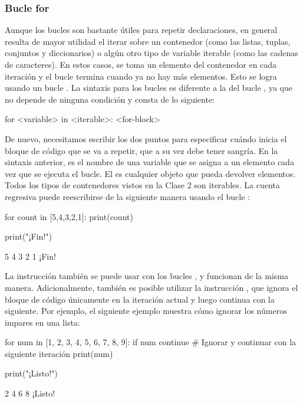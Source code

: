 \subsubsection{Bucle for}
Aunque los bucles  son bastante útiles para repetir declaraciones, en general resulta de mayor utilidad el iterar sobre un contenedor (como las listas, tuplas, conjuntos y diccionarios) o algún otro tipo de variable iterable (como las cadenas de caracteres). En estos casos, se toma un elemento del contenedor en cada iteración y el bucle termina cuando ya no hay más elementos. Esto se logra usando un bucle . La sintaxis para los bucles  es diferente a la del bucle , ya que no depende de ninguna condición y consta de lo siguiente:

\begin{shell}
for <variable> in <iterable>:
    <for-block>
\end{shell}

De nuevo, necesitamos escribir los dos puntos para especificar cuándo inicia el bloque de código que se va a repetir, que a su vez debe tener sangría. En la sintaxis anterior,  es el nombre de una variable que se asigna a un elemento cada vez que se ejecuta el bucle. El  es cualquier objeto que pueda devolver elementos. Todos los tipos de contenedores vistos en la Clase 2 son iterables. La cuenta regresiva puede reescribirse de la siguiente manera usando el bucle :

\begin{pyin}
for count in [5,4,3,2,1]:
    print(count)
    
print("¡Fin!")
\end{pyin}
\begin{pyprint}
5
4
3
2
1
¡Fin!
\end{pyprint}

La instrucción  también se puede usar con los bucles , y funcionan de la misma manera. Adicionalmente, también es posible utilizar la instrucción , que ignora el bloque de código únicamente en la iteración actual y luego continua con la siguiente. Por ejemplo, el siguiente ejemplo muestra cómo ignorar los números impares en una lista:

\begin{pyin}
for num in [1, 2, 3, 4, 5, 6, 7, 8, 9]:
    if num %
        continue  # Ignorar y continuar con la siguiente iteración
    print(num)

print("¡Listo!")
\end{pyin}
\begin{pyprint}
2
4
6
8
¡Listo!
\end{pyprint}


